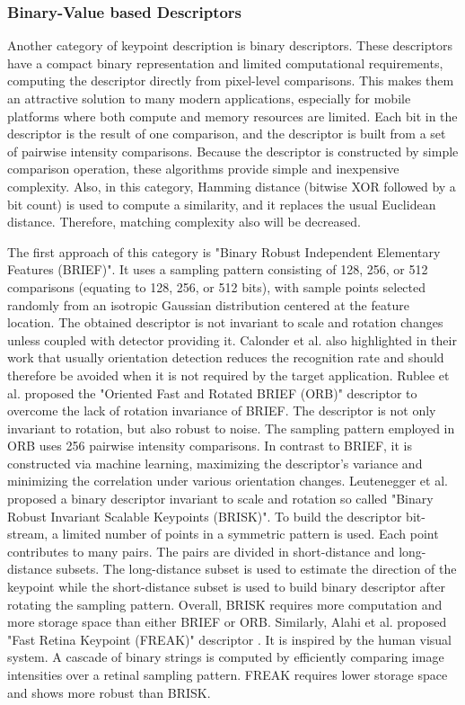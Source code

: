 \subsubsection{Binary-Value based Descriptors}
Another category of keypoint description is binary descriptors. These descriptors have a compact binary representation and limited computational requirements, computing the descriptor directly from pixel-level comparisons. This makes them an attractive solution to many modern applications, especially for mobile platforms where both compute and memory resources are limited. Each bit in the descriptor is the result of one comparison, and the descriptor is built from a set of pairwise intensity comparisons. Because the descriptor is constructed by simple comparison operation, these algorithms provide simple and inexpensive complexity. Also, in this category, Hamming distance (bitwise XOR followed by a bit count) is used to compute a similarity, and it replaces the usual Euclidean distance. Therefore, matching complexity also will be decreased. 

The first approach of this category is "Binary Robust Independent Elementary Features (BRIEF)"\cite{calonder_brief:_2010}. It uses a sampling pattern consisting of 128, 256, or 512 comparisons (equating to 128, 256, or 512 bits), with sample points selected randomly from an isotropic Gaussian distribution centered at the feature location. The obtained descriptor is not invariant to scale and rotation changes unless coupled with detector providing it. Calonder et al. also highlighted in their work that usually orientation detection reduces the recognition rate and should therefore be avoided when it is not required by the target application. Rublee et al. proposed the "Oriented Fast and Rotated BRIEF (ORB)" descriptor\cite{rublee_orb:_2011} to overcome the lack of rotation invariance of BRIEF. The descriptor is not only invariant to rotation, but also robust to noise. The sampling pattern employed in ORB uses 256 pairwise intensity comparisons. In contrast to BRIEF, it is constructed via machine learning, maximizing the descriptor’s variance and minimizing the correlation under various orientation changes. Leutenegger et al. proposed a binary descriptor invariant to scale and rotation so called "Binary Robust Invariant Scalable Keypoints (BRISK)"\cite{leutenegger_brisk:_2011}. To build the descriptor bit-stream, a limited number of points in a symmetric pattern is used. Each point contributes to many pairs. The pairs are divided in short-distance and long-distance subsets. The long-distance subset is used to estimate the direction of the keypoint while the short-distance subset is used to build binary descriptor after rotating the sampling pattern. Overall, BRISK requires more computation and more storage space than either BRIEF or ORB. Similarly, Alahi et al. proposed "Fast Retina Keypoint (FREAK)" descriptor \cite{alahi_freak:_2012}. It is inspired by the human visual system. A cascade of binary strings is computed by efficiently comparing image intensities over a retinal sampling pattern. FREAK requires lower storage space and shows more robust than BRISK.


